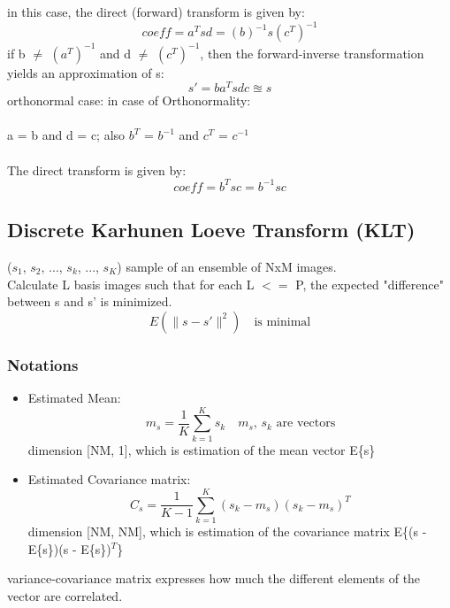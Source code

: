 \documentclass{article}
\begin{document}
in this case, the direct (forward) transform is given by:
\begin{equation}
    coeff = a^T s d = (b)^{-1} s (c^T)^{-1}
\end{equation}
if b $\neq$ $(a^T)^{-1}$ and d $\neq$ $(c^T)^{-1}$, then the forward-inverse transformation yields an approximation of s:
\begin{equation}
    s' = b a^T s d c \approxeq s
\end{equation}
orthonormal case:
in case of Orthonormality:\\
\\
a = b and d = c; also $b^T$ = $b^{-1}$ and $c^T$ = $c^{-1}$ \\
\\
The direct transform is given by:
\begin{equation}
    coeff = b^T s c = b^{-1} s c
\end{equation}
\subsection{Discrete Karhunen Loeve Transform (KLT)}
($s_1$, $s_2$, ..., $s_k$, ..., $s_K$) sample of an ensemble of NxM images. \\
Calculate L basis images such that for each L $<=$ P, the expected "difference" between s and s' is minimized. \\
\begin{equation}
    E\left( \lVert s - s' \rVert^2 \right) \quad \textrm{is minimal}
\end{equation}
\subsubsection{Notations}
\begin{itemize}
    \item Estimated Mean: \\ \begin{equation}
        m_s = \frac{1}{K} \sum_{k=1}^{K} s_k \quad \textrm{$m_s$, $s_k$ are vectors}
    \end{equation}
    dimension [NM, 1], which is estimation of the mean vector E\{s\}
    \item Estimated Covariance matrix: \\ \begin{equation}
        C_s = \frac{1}{K-1} \sum_{k=1}^{K} (s_k - m_s)(s_k - m_s)^T
    \end{equation}
    dimension [NM, NM], which is estimation of the covariance matrix E\{(s - E\{s\})(s - E\{s\})$^T$\}
\end{itemize}
variance-covariance matrix expresses how much the different elements of the vector are correlated. \\
\end{document}
